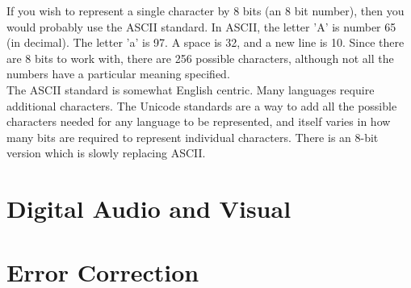 If you wish to represent a single character by 8 bits (an 8 bit number), then you would probably use the ASCII standard. In ASCII, the letter 'A' is number 65 (in decimal). The letter 'a' is 97. A space is 32, and a new line is 10. Since there are 8 bits to work with, there are 256 possible characters, although not all the numbers have a particular meaning specified.\\

The ASCII standard is somewhat English centric. Many languages require additional characters. The Unicode standards are a way to add all the possible characters needed for any language to be represented, and itself varies in how many bits are required to represent individual characters. There is an 8-bit version which is slowly replacing ASCII.



\section{Digital Audio and Visual}

\begin{center}\end{center}


\begin{center}\end{center}
\begin{center}\end{center}
\begin{center}\end{center}
\begin{center}\end{center}
\begin{center}\end{center}
\begin{center}\end{center}

\section{Error Correction}

\begin{center}\end{center}

